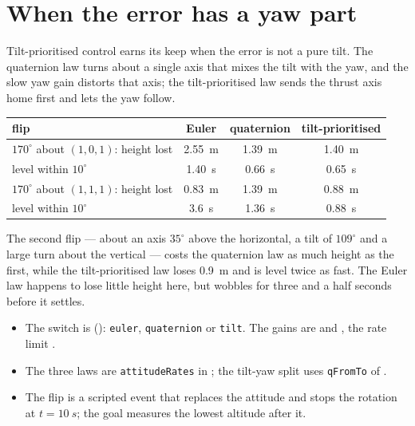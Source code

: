 \section{When the error has a yaw part}

Tilt-prioritised control earns its keep when the error is not a pure tilt. The quaternion law turns about a single axis that mixes the tilt with the yaw, and the slow yaw gain distorts that axis; the tilt-prioritised law sends the thrust axis home first and lets the yaw follow.

\begin{center}\small\sffamily
\begin{tabular}{lccc}
\toprule
flip & Euler & quaternion & tilt-prioritised\\
\midrule
$170^\circ$ about $(1, 0, 1)$: height lost & \SI{2.55}{m} & \SI{1.39}{m} & \SI{1.40}{m}\\
\phantom{$170^\circ$ about $(1, 0, 1)$:} level within $10^\circ$ & \SI{1.40}{s} & \SI{0.66}{s} & \SI{0.65}{s}\\
$170^\circ$ about $(1, 1, 1)$: height lost & \SI{0.83}{m} & \SI{1.39}{m} & \SI{0.88}{m}\\
\phantom{$170^\circ$ about $(1, 1, 1)$:} level within $10^\circ$ & \SI{3.6}{s} & \SI{1.36}{s} & \SI{0.88}{s}\\
\bottomrule
\end{tabular}
\end{center}

The second flip — about an axis $35^\circ$ above the horizontal, a tilt of $109^\circ$ and a large turn about the vertical — costs the quaternion law as much height as the first, while the tilt-prioritised law loses \SI{0.9}{m} and is level twice as fast. The Euler law happens to lose little height here, but wobbles for three and a half seconds before it settles.


\begin{inapp}
\begin{itemize}[leftmargin=1.2em]
  \item The switch is  (): \texttt{euler}, \texttt{quaternion} or \texttt{tilt}. The gains are  and , the rate limit .
  \item The three laws are \texttt{attitudeRates} in ; the tilt-yaw split uses \texttt{qFromTo} of .
  \item The flip is a scripted event that replaces the attitude and stops the rotation at $t = \SI{10}{s}$; the goal measures the lowest altitude after it.
\end{itemize}
\end{inapp}

